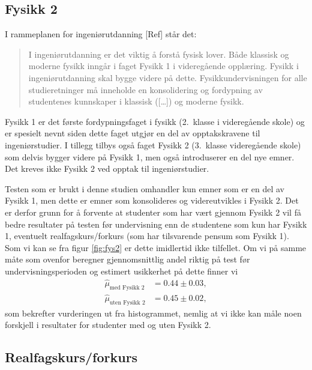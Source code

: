 \documentclass[a4paper,norsk,12pt]{report}
\begin{document}
\subsection{Fysikk 2}
I rammeplanen for ingeniørutdanning {\color{red}[Ref]} står det:
\begin{quote}I ingeniørutdanning er det viktig å forstå fysisk lover. Både klassisk og moderne fysikk inngår i faget Fysikk 1 i videregående opplæring. Fysikk i ingeniørutdanning skal bygge videre på dette. Fysikkundervisningen for alle studieretninger må inneholde en konsolidering og fordypning av studentenes kunnskaper i klassisk ([\ldots]) og moderne fysikk.\end{quote}
Fysikk 1 er det første fordypningsfaget i fysikk (2.~klasse i videregående skole) og er spesielt nevnt siden dette faget utgjør en del av opptakskravene til ingeniørstudier. I tillegg tilbys også faget Fysikk 2 (3.~klasse videregående skole) som delvis bygger videre på Fysikk 1, men også introduserer en del nye emner. Det kreves ikke Fysikk 2 ved opptak til ingeniørstudier. 

Testen som er brukt i denne studien omhandler kun emner som er en del av Fysikk 1, men dette er emner som konsolideres og videreutvikles i Fysikk 2. Det er derfor grunn for å forvente at studenter som har vært gjennom Fysikk 2 vil få bedre resultater på testen før undervisning enn de studentene som kun har Fysikk 1, eventuelt realfagskurs/forkurs (som har tilsvarende pensum som Fysikk 1). Som vi kan se fra figur \ref{fig:fys2} er dette imidlertid ikke tilfellet. Om vi på samme måte som ovenfor beregner gjennomsnittlig andel riktig på test før undervisningsperioden og estimert usikkerhet på dette finner vi
\begin{displaymath}
\begin{aligned}
	\hat{\mu}_\text{med Fysikk 2} &= 0.44\pm 0.03, \\
	\hat{\mu}_\text{uten Fysikk 2} &= 0.45\pm 0.02,
\end{aligned}
\end{displaymath}
som bekrefter vurderingen ut fra histogrammet, nemlig at vi ikke kan måle noen forskjell i resultater for studenter med og uten Fysikk 2. 


\subsection{Realfagskurs/forkurs}
\end{document}
